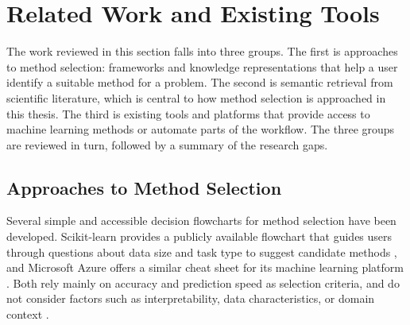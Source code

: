 \section{Related Work and Existing Tools}
\label{sec:related-work-and-existing-tools}

The work reviewed in this section 
falls into three groups. The first is 
approaches to method selection: frameworks and knowledge 
representations that help a user identify a suitable method for 
a problem. The second is semantic retrieval from scientific 
literature, which is central to how method selection is 
approached in this thesis. The third is existing tools and 
platforms that provide access to machine learning methods or 
automate parts of the workflow. The three groups are reviewed in 
turn, followed by a summary of the research gaps.

\subsection{Approaches to Method Selection}
\label{sec:approaches-to-method-selection}

Several simple and accessible decision flowcharts for method selection have
been developed. Scikit-learn provides a publicly available 
flowchart that guides users through questions about data size 
and task type to suggest candidate methods 
\parencite{sklearn_algorithm_cheatsheet}, and Microsoft Azure 
offers a similar cheat sheet for its machine learning platform 
\parencite{azure_algorithm_cheatsheet}. Both rely mainly on 
accuracy and prediction speed as selection criteria, and do 
not consider factors such as interpretability, data 
characteristics, or domain context 
\parencite{sala2018selecting_ml_algorithm}.

